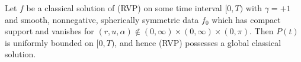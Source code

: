 \begin{theorem}
Let $f$ be a classical solution of (RVP) on some time interval $[0, T)$ with $\gamma=+1$ and smooth, nonnegative, spherically symmetric data $f_0$ which has compact support and vanishes for $(r, u, \alpha) \notin(0, \infty) \times(0, \infty) \times(0, \pi) $. Then $P(t)$ is uniformly bounded on $[0, T)$, and hence (RVP) possesses a global classical solution.
\end{theorem}



    
